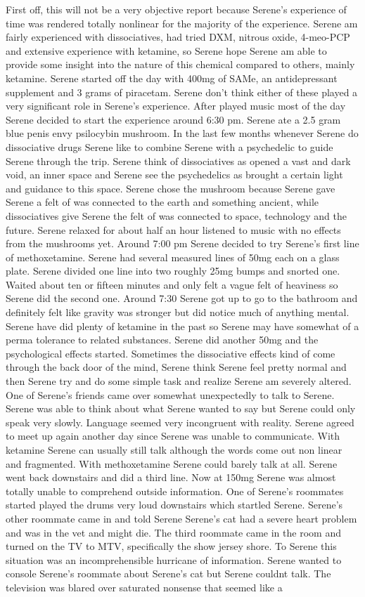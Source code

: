 \documentclass[12pt]{book}
\begin{document}
First off, this will not be a very objective report because Serene's experience of time was rendered totally nonlinear for the majority of the experience. Serene am fairly experienced with dissociatives, had tried DXM, nitrous oxide, 4-meo-PCP and extensive experience with ketamine, so Serene hope Serene am able to provide some insight into the nature of this chemical compared to others, mainly ketamine. Serene started off the day with 400mg of SAMe, an antidepressant supplement and 3 grams of piracetam. Serene don't think either of these played a very significant role in Serene's experience. After played music most of the day Serene decided to start the experience around 6:30 pm. Serene ate a 2.5 gram blue penis envy psilocybin mushroom. In the last few months whenever Serene do dissociative drugs Serene like to combine Serene with a psychedelic to guide Serene through the trip. Serene think of dissociatives as opened a vast and dark void, an inner space and Serene see the psychedelics as brought a certain light and guidance to this space. Serene chose the mushroom because Serene gave Serene a felt of was connected to the earth and something ancient, while dissociatives give Serene the felt of was connected to space, technology and the future. Serene relaxed for about half an hour listened to music with no effects from the mushrooms yet. Around 7:00 pm Serene decided to try Serene's first line of methoxetamine. Serene had several measured lines of 50mg each on a glass plate. Serene divided one line into two roughly 25mg bumps and snorted one. Waited about ten or fifteen minutes and only felt a vague felt of heaviness so Serene did the second one. Around 7:30 Serene got up to go to the bathroom and definitely felt like gravity was stronger but did notice much of anything mental. Serene have did plenty of ketamine in the past so Serene may have somewhat of a perma tolerance to related substances. Serene did another 50mg and the psychological effects started. Sometimes the dissociative effects kind of come through the back door of the mind, Serene think Serene feel pretty normal and then Serene try and do some simple task and realize Serene am severely altered. One of Serene's friends came over somewhat unexpectedly to talk to Serene. Serene was able to think about what Serene wanted to say but Serene could only speak very slowly. Language seemed very incongruent with reality. Serene agreed to meet up again another day since Serene was unable to communicate. With ketamine Serene can usually still talk although the words come out non linear and fragmented. With methoxetamine Serene could barely talk at all. Serene went back downstairs and did a third line. Now at 150mg Serene was almost totally unable to comprehend outside information. One of Serene's roommates started played the drums very loud downstairs which startled Serene. Serene's other roommate came in and told Serene Serene's cat had a severe heart problem and was in the vet and might die. The third roommate came in the room and turned on the TV to MTV, specifically the show jersey shore. To Serene this situation was an incomprehensible hurricane of information. Serene wanted to console Serene's roommate about Serene's cat but Serene couldnt talk. The television was blared over saturated nonsense that seemed like a 
\end{document}

